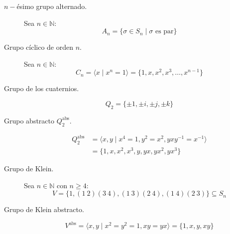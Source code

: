 \begin{description}
\begin{equation*}
        \end{equation*}
    \item [$n-$ésimo grupo alternado.] Sea $n\in \mathbb{N}$:
        \begin{equation*}
            A_n = \{\sigma\in S_n \mid \sigma \text{\ es par}\}
        \end{equation*}
    \item [Grupo cíclico de orden $n$.] Sea $n\in \mathbb{N}$:
        \begin{equation*}
            C_n = \langle x\mid x^n = 1 \rangle  = \{1,x,x^2,x^3,\ldots,x^{n-1}\}
        \end{equation*}
    \item [Grupo de los cuaternios.] 
        \begin{equation*}
            Q_2 = \{\pm 1, \pm i,\pm j,\pm k\}
        \end{equation*}
    \item [Grupo abstracto $Q_2^\text{abs}$.] 
        \begin{align*}
            Q_2^\text{abs} &= \langle x,y\mid x^4=1, y^2 = x^2, yxy^{-1}=x^{-1} \rangle \\
                           &= \{1,x,x^2,x^3,y,yx,yx^2,yx^3\}
        \end{align*}
    \item [Grupo de Klein.] Sea $n\in \mathbb{N}$ con $n\geq 4$:
        \begin{equation*}
            V = \{1, (1\ 2)(3\ 4), (1\ 3)(2\ 4), (1\ 4)(2\ 3)\} \subseteq S_n
        \end{equation*}
    \item [Grupo de Klein abstracto.]
        \begin{equation*}
            V^{\text{abs}} = \langle x,y\mid x^2=y^2=1, xy=yx \rangle  = \{1,x,y,xy\}
        \end{equation*}
\end{description}
